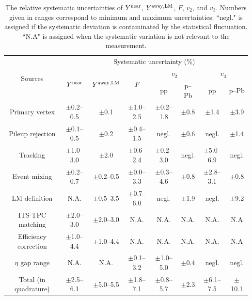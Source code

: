 \begin{table}[h!]
\caption{The relative systematic uncertainties of $Y^{\rm{near}}$, $Y^{\rm{away,LM}}$, $F$, $v_{2}$, and $v_{3}$. Numbers given in ranges correspond to minimum and maximum uncertainties. ``negl." is assigned if the systematic deviation is contaminated by the statistical fluctuation. ``N.A" is assigned when the systematic variation is not relevant to the measurement. }
\centering
\label{tab:syst}
\resizebox{\textwidth}{!} {
\begin{tabular}{c|ccccccc}
\hline 
\multirow{3}{*}{Sources}  & \multicolumn{7}{c}{Systematic uncertainty (\%)} \\ \cline{2-8} 
& \multirow{2}{*}{$Y^{\rm{near}}$} & \multirow{2}{*}{$Y^{\rm{away,LM}}$} & \multirow{2}{*}{$F$} & \multicolumn{2}{c}{$v_{2}$} & \multicolumn{2}{c}{$v_{3}$}  \\   \cline{5-8}
& & & & pp & p--Pb & pp & p--Pb  \\ \cline{1-8} 
Primary vertex       & $\pm$0.2--0.5 & $\pm$0.1      & $\pm$1.0--2.5 & $\pm$0.2--1.8 & $\pm$0.8 & $\pm$1.4 & $\pm$3.9 \\ 
Pileup rejection     & $\pm$0.1--0.5 & $\pm$0.2      & $\pm$0.4--1.5 & negl.         & $\pm$0.6 & negl. & $\pm$1.4 \\ 
Tracking		     & $\pm$1.0--3.0 & $\pm$2.0      & $\pm$0.6--2.4 & $\pm$0.2--3.0 & negl. & $\pm$5.0--6.9 & negl. \\ 
Event mixing	     & $\pm$0.2--0.7 & $\pm$0.2--0.5 & $\pm$0.0--3.3 & $\pm$0.3--4.6 & $\pm$0.8 & $\pm$2.8--3.1 & $\pm$0.8 \\ 
LM definition   	 & N.A.          & $\pm$0.5--3.5 & $\pm$0.7--6.0 & negl.         & $\pm$1.9 & negl. & $\pm$9.2\\ 
ITS-TPC matching 	 & $\pm$2.0--3.0 & $\pm$2.0--3.0 & N.A.          & N.A.          & N.A. & N.A. & N.A\\ 
Efficiency correction& $\pm$1.0--4.4 & $\pm$1.0--4.4 & N.A.          & N.A.          & N.A. & N.A. & N.A\\ 
$\eta$ gap range   	 & N.A.          & N.A.          & $\pm$0.1--3.2 & $\pm$1.0--5.0 & $\pm$0.4 & negl. & negl. \\ 

\hline 
Total (in quadrature)& $\pm$2.5--6.1 & $\pm$5.0--5.5 & $\pm$1.8--7.1 & $\pm$0.8--5.7 & $\pm$2.3 & $\pm$6.1--7.5 & $\pm$10.1 \\ 
\hline 
\end{tabular}
}
\end{table}

